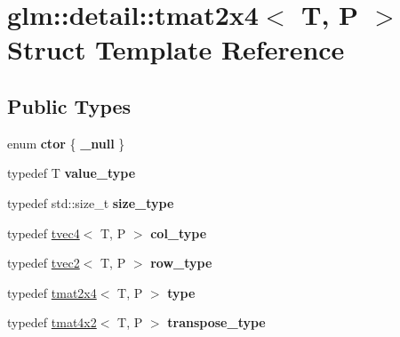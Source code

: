 \hypertarget{structglm_1_1detail_1_1tmat2x4}{\section{glm\-:\-:detail\-:\-:tmat2x4$<$ T, P $>$ Struct Template Reference}
\label{structglm_1_1detail_1_1tmat2x4}
}
\subsection*{Public Types}
\begin{DoxyCompactItemize}
\item 
enum {\bfseries ctor} \{ {\bfseries \-\_\-null}
 \}
\item 
\hypertarget{structglm_1_1detail_1_1tmat2x4_a4c650fe9e8b18e4b41fc8f6b3c5e0fb7}{typedef T {\bfseries value\-\_\-type}}\label{structglm_1_1detail_1_1tmat2x4_a4c650fe9e8b18e4b41fc8f6b3c5e0fb7}

\item 
\hypertarget{structglm_1_1detail_1_1tmat2x4_a93a0c2fd19243d8fa55a0c45a740794d}{typedef std\-::size\-\_\-t {\bfseries size\-\_\-type}}\label{structglm_1_1detail_1_1tmat2x4_a93a0c2fd19243d8fa55a0c45a740794d}

\item 
\hypertarget{structglm_1_1detail_1_1tmat2x4_a7324a2efc8a0f59f538568015bdda76b}{typedef \hyperlink{structglm_1_1detail_1_1tvec4}{tvec4}$<$ T, P $>$ {\bfseries col\-\_\-type}}\label{structglm_1_1detail_1_1tmat2x4_a7324a2efc8a0f59f538568015bdda76b}

\item 
\hypertarget{structglm_1_1detail_1_1tmat2x4_a3048033664c24f3c2bb2f326f32a0654}{typedef \hyperlink{structglm_1_1detail_1_1tvec2}{tvec2}$<$ T, P $>$ {\bfseries row\-\_\-type}}\label{structglm_1_1detail_1_1tmat2x4_a3048033664c24f3c2bb2f326f32a0654}

\item 
\hypertarget{structglm_1_1detail_1_1tmat2x4_a6e5bd72f58de7f3b40f3e9cf74df9b89}{typedef \hyperlink{structglm_1_1detail_1_1tmat2x4}{tmat2x4}$<$ T, P $>$ {\bfseries type}}\label{structglm_1_1detail_1_1tmat2x4_a6e5bd72f58de7f3b40f3e9cf74df9b89}

\item 
\hypertarget{structglm_1_1detail_1_1tmat2x4_ad89bce74852aa9d53de6c2b780e7854f}{typedef \hyperlink{structglm_1_1detail_1_1tmat4x2}{tmat4x2}$<$ T, P $>$ {\bfseries transpose\-\_\-type}}\label{structglm_1_1detail_1_1tmat2x4_ad89bce74852aa9d53de6c2b780e7854f}

\end{DoxyCompactItemize}
